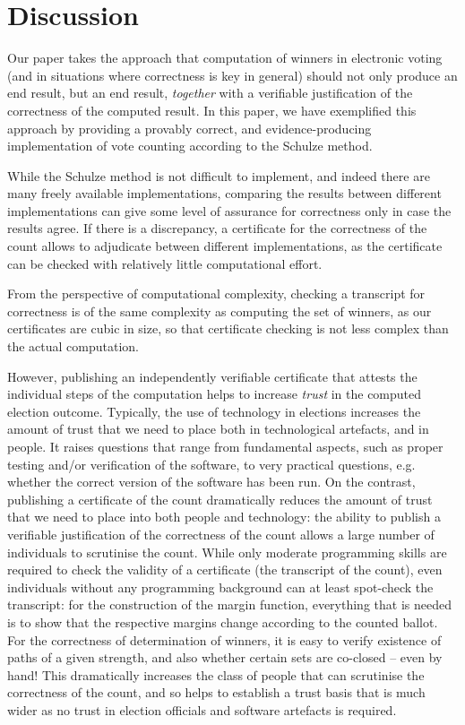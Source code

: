   
 \section{Discussion} \label{sec:discussion}

Our paper takes the approach that computation of winners in
electronic voting (and in situations where correctness is key in
general) should not only produce an end result, but an end result,
\emph{together} with a verifiable justification of the correctness
of the computed result. In this paper, we have exemplified this
approach by providing a provably correct, and evidence-producing
implementation of vote counting according to the Schulze method. 

While the Schulze method is not difficult to implement, and indeed
there are many freely available implementations, comparing the
results between different implementations can give some level of
assurance for correctness only in case the results agree.  If there
is a discrepancy, a certificate for the correctness of the count
allows to adjudicate between different implementations, as the
certificate can be checked with relatively little computational
effort. 

From the perspective of computational complexity, checking a
transcript for correctness is of the same complexity as computing
the set of winners, as our certificates are cubic in size, so that
certificate checking is not less complex than the actual
computation. 

However, publishing an independently verifiable certificate that
attests the individual steps of the computation helps to increase
\emph{trust} in the computed election outcome. Typically, the use of technology in
elections increases the amount of trust that we need to place both
in technological artefacts, and in people. It raises questions that
range from fundamental aspects, such as proper testing and/or
verification of the software, to very practical questions, e.g.
whether the correct version of the software has been run.  On the
contrast, publishing a certificate of the count dramatically reduces
the amount of trust that we need to place into both people and
technology: the ability to publish a verifiable justification of the
correctness of the count allows a large number of individuals to
scrutinise the count. While only moderate programming skills are
required to check the validity of a certificate (the transcript of
the count), even individuals without any programming background can
at least spot-check the transcript: for the construction of the
margin function, everything that is needed is to show that the
respective margins change according to the counted ballot. For the
correctness of determination of winners, it is easy to verify
existence of paths of a given strength, and also whether certain
sets are co-closed -- even by hand! This dramatically increases the
class of people that can scrutinise the correctness of the count,
and so helps to establish a trust basis that is much wider as no
trust in election officials and software artefacts is required.

